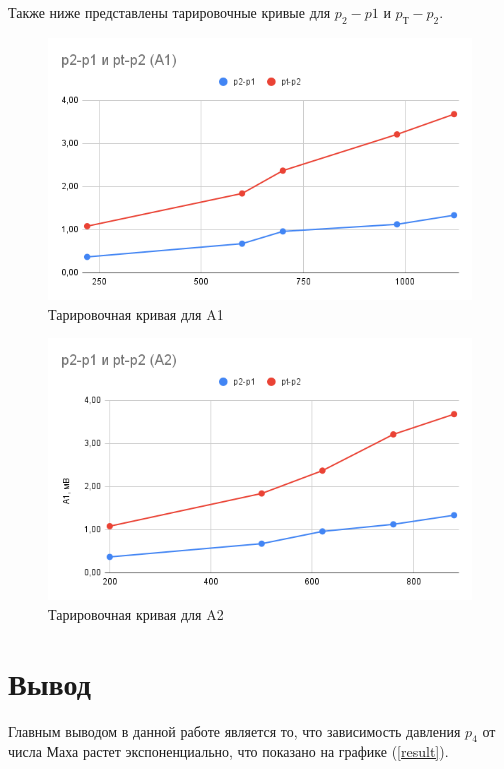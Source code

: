 \documentclass[a4paper,14pt]{article}
\begin{document}
\clearpage

Также ниже представлены тарировочные кривые для $p_2 - p1$ и $p_Т - p_2$.
\begin{figure}[h!]
    \centering
    \includegraphics[scale=0.7]{A1.png}
    \caption{Тарировочная кривая для A1}
\end{figure}

\begin{figure}[h!]
    \centering
    \includegraphics[scale=0.7]{A2.png}
    \caption{Тарировочная кривая для A2}
\end{figure}

\section{Вывод}

Главным выводом в данной работе является то, что зависимость давления $p_4$ от числа Маха растет экспоненциально, что показано на графике (\ref{result}).
\end{document}
